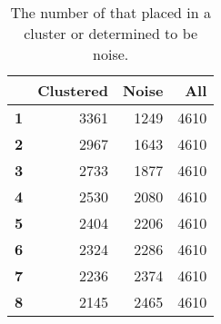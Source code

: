\begin{table}[ht!]
\setlength{\arrayrulewidth}{1pt}
\centering
\begin{tabular}{|r|r|r|r|}
\hline
\bf \minneigh{}&\bf Clustered&\bf Noise&\bf All \Isols{}
\\
\hline
\hline
\bf 1 & 3361 & 1249 & 4610
\\
\hline
\bf 2 & 2967 & 1643 & 4610
\\
\hline
\bf 3 & 2733 & 1877 & 4610
\\
\hline
\bf 4 & 2530 & 2080 & 4610
\\
\hline
\bf 5 & 2404 & 2206 & 4610
\\
\hline
\bf 6 & 2324 & 2286 & 4610
\\
\hline
\bf 7 & 2236 & 2374 & 4610
\\
\hline
\bf 8 & 2145 & 2465 & 4610
\\
\hline
\end{tabular}
\caption{The number of \isols{} that \dbscan{} placed in a cluster or determined to be noise.}
\label{tab:coverage:values:clustered:noise}
\end{table}
